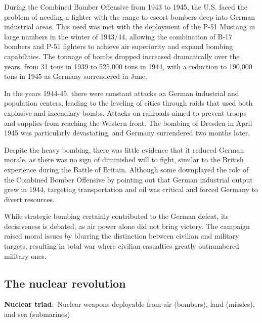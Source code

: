 \documentclass[nobib]{tufte-handout}
\newcommand{\defn}[2]{\noindent\textbf{#1}:\ #2}
\begin{document}
During the Combined Bomber Offensive from 1943 
to 1945, the U.S. faced the problem of needing 
a fighter with the range to escort bombers deep
into German industrial areas. This need was met 
with the deployment of the P-51 Mustang in large 
numbers in the winter of 1943/44, allowing the 
combination of B-17 bombers and P-51 fighters 
to achieve air superiority and expand bombing 
capabilities. The tonnage of bombs dropped 
increased dramatically over the years, from 31 
tons in 1939 to 525,000 tons in 1944, with a 
reduction to 190,000 tons in 1945 as Germany 
surrendered in June.

In the years 1944-45, there were constant 
attacks on German industrial and population 
centers, leading to the leveling of cities 
through raids that used both explosive and 
incendiary bombs. Attacks on railroads aimed 
to prevent troops and supplies from reaching 
the Western front. The bombing of Dresden in 
April 1945 was particularly devastating, and 
Germany surrendered two months later.

Despite the heavy bombing, there was little 
evidence that it reduced German morale, as 
there was no sign of diminished will to fight, 
similar to the British experience during the 
Battle of Britain. Although some downplayed 
the role of the Combined Bomber Offensive by 
pointing out that German industrial output 
grew in 1944, targeting transportation and 
oil was critical and forced Germany to divert 
resources. 

While strategic bombing certainly contributed 
to the German defeat, its decisiveness is 
debated, as air power alone did not bring 
victory. The campaign raised moral issues by 
blurring the distinction between civilian and 
military targets, resulting in total war where 
civilian casualties greatly outnumbered military 
ones.

\subsection{The nuclear revolution}

\defn{Nuclear triad}{Nuclear weapons deployable 
from air (bombers), land (missles), and sea (submarines)}
\end{document}
